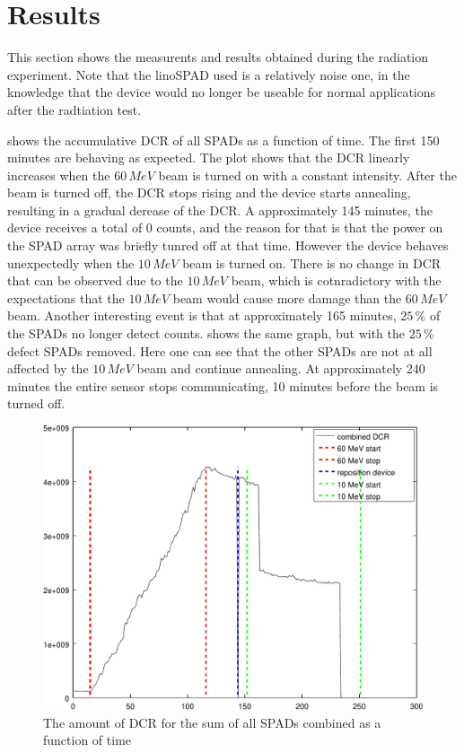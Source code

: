 \section{Results}\label{ssec:results}
This section shows the measurents and results obtained during the radiation experiment. Note that the linoSPAD used is a relatively noise one, in the knowledge that the device  would no longer be useable for normal applications after the radtiation test.

 shows the accumulative DCR of all SPADs as a function of time. The first 150 minutes are behaving as expected. The plot shows that the DCR linearly increases when the $60\,MeV$ beam  is turned on with a constant intensity. After the beam is turned off, the DCR stops rising and the device starts annealing, resulting in a gradual derease of the DCR. A approximately 145 minutes, the device receives a total of 0 counts, and the reason for that is that the power on the SPAD array was briefly tunred off at that time. However the device behaves unexpectedly when the $10\,MeV$ beam is turned on. There is no change in DCR that can be observed due to the $10\,MeV$ beam, which is cotnradictory with the expectations that the $10\,MeV$ beam would cause more damage than the $60\,MeV$ beam. Another interesting event is that at approximately 165 minutes, $25\,\%$ of the SPADs no longer detect counts.  shows the same graph, but with the $25\,\%$ defect SPADs removed. Here one can see that the other SPADs are not at all affected by the $10\,MeV$ beam and continue annealing. At approximately 240 minutes the entire sensor stops communicating, 10 minutes before the beam is turned off.



\begin{figure}[h]
\centering
	\includegraphics[width=0.6\linewidth]{fig/count_vs_time_sum_all.pdf}
\caption{The amount of DCR for the sum of all SPADs combined as a function of time}
\label{fig:count_vs_time_sum_all}
\end{figure}


